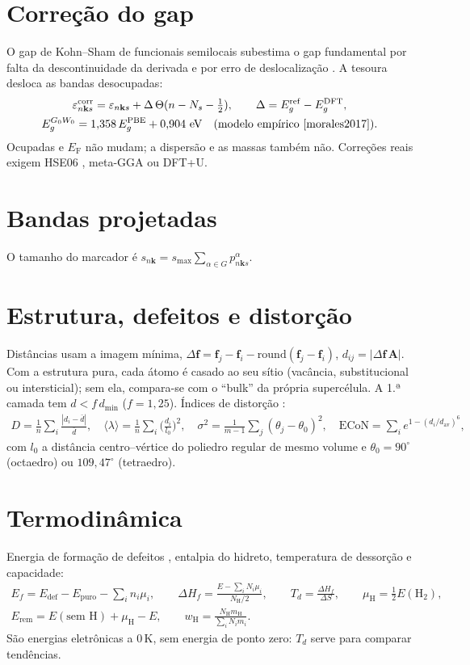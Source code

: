 \documentclass[11pt,a4paper]{article}
\newcommand{\kv}{\mathbf k}\newcommand{\eF}{E_\mathrm{F}}\newcommand{\code}[1]{\texttt{#1}}
\begin{document}
\section{Correção do gap}
O gap de Kohn--Sham de funcionais semilocais subestima o gap fundamental por falta da descontinuidade da derivada \cite{perdew1983,sham1983} e por erro de deslocalização \cite{morisanchez2008}. A tesoura \cite{levine1989} desloca as bandas desocupadas:
\begin{gather}
\varepsilon^\mathrm{corr}_{n\kv s}=\varepsilon_{n\kv s}+\Delta\,\Theta(n-N_s-\tfrac12),\qquad \Delta=E_g^\mathrm{ref}-E_g^\mathrm{DFT},\\
E_g^{G_0W_0}=1{,}358\,E_g^\mathrm{PBE}+0{,}904\ \mathrm{eV}\quad\text{(modelo empírico \cite{morales2017})}.
\end{gather}
Ocupadas e $\eF$ não mudam; a dispersão e as massas também não. Correções reais exigem HSE06 \cite{heyd2003}, meta-GGA ou DFT+U.

\section{Bandas projetadas}
O tamanho do marcador é $s_{n\kv}=s_\mathrm{max}\sum_{\alpha\in G}p^\alpha_{n\kv s}$.

\section{Estrutura, defeitos e distorção}
Distâncias usam a imagem mínima, $\Delta\mathbf f=\mathbf f_j-\mathbf f_i-\mathrm{round}(\mathbf f_j-\mathbf f_i)$, $d_{ij}=|\Delta\mathbf f\,\mathbf A|$. Com a estrutura pura, cada átomo é casado ao seu sítio (vacância, substitucional ou intersticial); sem ela, compara-se com o ``bulk'' da própria supercélula. A 1.ª camada tem $d<f\,d_\mathrm{min}$ ($f=1{,}25$). Índices de distorção \cite{baur1974,robinson1971,hoppe1979}:
\begin{gather}
D=\frac1n\sum_i\frac{|d_i-\bar d|}{\bar d},\quad \langle\lambda\rangle=\frac1n\sum_i\Big(\frac{d_i}{l_0}\Big)^2,\quad \sigma^2=\frac{1}{m-1}\sum_j(\theta_j-\theta_0)^2,\quad
\mathrm{ECoN}=\sum_ie^{1-(d_i/d_\mathrm{av})^6},
\end{gather}
com $l_0$ a distância centro--vértice do poliedro regular de mesmo volume e $\theta_0=90^\circ$ (octaedro) ou $109{,}47^\circ$ (tetraedro).

\section{Termodinâmica}
Energia de formação de defeitos \cite{freysoldt2014,vandewalle2004}, entalpia do hidreto, temperatura de dessorção e capacidade:
\begin{gather}
E_f=E_\mathrm{def}-E_\mathrm{puro}-\sum_in_i\mu_i,\qquad \Delta H_f=\frac{E-\sum_iN_i\mu_i}{N_\mathrm H/2},\qquad T_d=\frac{\Delta H_f}{\Delta S},\qquad \mu_\mathrm H=\tfrac12E(\mathrm H_2),\\
E_\mathrm{rem}=E(\text{sem H})+\mu_\mathrm H-E,\qquad w_\mathrm H=\frac{N_\mathrm Hm_\mathrm H}{\sum_iN_im_i}.
\end{gather}
São energias eletrônicas a 0\,K, sem energia de ponto zero: $T_d$ serve para comparar tendências.
\end{document}

